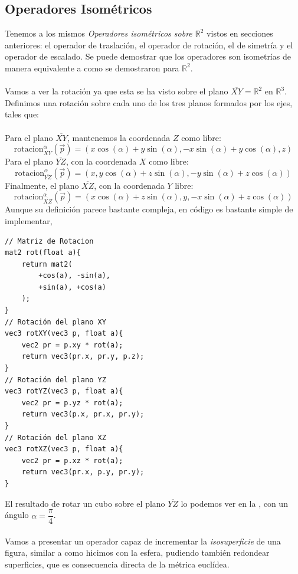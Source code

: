 \subsection{Operadores Isométricos}
Tenemos a los mismos \textit{Operadores isométricos sobre \(\mathbb{R}^2\)} vistos en secciones anteriores: el operador de traslación, el operador de rotación, el de simetría y el operador de escalado. Se puede demostrar que los operadores son isometrías de manera equivalente a como se demostraron para \(\mathbb{R}^2\).\\\\
Vamos a ver la rotación ya que esta se ha visto sobre el plano \(\overline{XY}=\mathbb{R}^2\) en \(\mathbb{R}^3\). Definimos una rotación sobre cada uno de los tres planos formados por los ejes, tales que:\\\\
Para el plano \(\overline{XY}\), mantenemos la coordenada \(Z\) como libre:
\[\text{rotacion}_{\overline{XY}}^\alpha(\Vec{p}) = \left(x\cos(\alpha) + y\sin(\alpha),-x\sin(\alpha) + y\cos(\alpha),z\right) \]
Para el plano \(\overline{YZ}\), con la coordenada \(X\) como libre:
\[\text{rotacion}_{\overline{YZ}}^\alpha(\Vec{p}) = \left(x, y\cos(\alpha) + z\sin(\alpha),-y\sin(\alpha) + z\cos(\alpha)\right) \]
Finalmente, el plano \(\overline{XZ}\), con la coordenada \(Y\) libre:
\[\text{rotacion}_{\overline{XZ}}^\alpha(\Vec{p}) = \left(x\cos(\alpha) + z\sin(\alpha),y,-x\sin(\alpha) + z\cos(\alpha)\right) \]
Aunque su definición parece bastante compleja, en código es bastante simple de implementar,
\begin{lstlisting}
// Matriz de Rotacion
mat2 rot(float a){
    return mat2(
        +cos(a), -sin(a), 
        +sin(a), +cos(a)
    );
}
// Rotación del plano XY
vec3 rotXY(vec3 p, float a){
    vec2 pr = p.xy * rot(a);
    return vec3(pr.x, pr.y, p.z);
}
// Rotación del plano YZ
vec3 rotYZ(vec3 p, float a){
    vec2 pr = p.yz * rot(a);
    return vec3(p.x, pr.x, pr.y);
}
// Rotación del plano XZ
vec3 rotXZ(vec3 p, float a){
    vec2 pr = p.xz * rot(a);
    return vec3(pr.x, p.y, pr.y);
}
\end{lstlisting}

El resultado de rotar un cubo sobre el plano \(\overline{YZ}\) lo podemos ver en la , con un ángulo \(\alpha=\dfrac{\pi}{4}\).\\\\
Vamos a presentar un operador capaz de incrementar la \textit{isosuperficie} de una figura, similar a como hicimos con la esfera, pudiendo también redondear superficies, que es consecuencia directa de la métrica euclídea.


